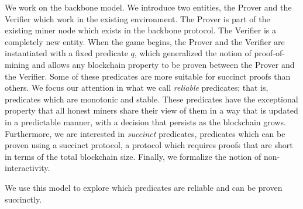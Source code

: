 We work on the backbone model. We introduce two entities, the Prover and the
Verifier which work in the existing environment. The Prover is part of the
existing miner node which exists in the backbone protocol. The Verifier is a
completely new entity. When the game begins, the Prover and the Verifier are
instantiated with a fixed predicate $q$, which generalized the notion of
proof-of-mining and allows any blockchain property to be proven between the
Prover and the Verifier. Some of these predicates are more suitable for
succinct proofs than others. We focus our attention in what we call \textit{
reliable} predicates; that is, predicates which are monotonic and stable.
These predicates have the exceptional property that all honest miners share
their view of them in a way that is updated in a predictable manner, with a
decision that persists as the blockchain grows. Furthermore, we are interested
in \textit{succinct} predicates, predicates which can be proven using a
succinct protocol, a protocol which requires proofs that are short in terms of
the total blockchain size. Finally, we formalize the notion of
non-interactivity.

We use this model to explore which predicates are reliable and can be proven
succinctly.
